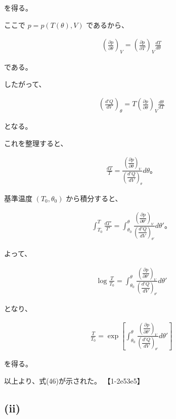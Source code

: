 \documentclass[platex,dvipdfmx,a4paper]{jsarticle}
\begin{document}
を得る。

ここで $p=p(T(\theta),V)$ であるから、

\begin{align*}
\left(
\frac{\partial p}{\partial \theta}
\right)_V
=
\left(
\frac{\partial p}{\partial T}
\right)_V
\frac{dT}{d\theta}
\end{align*}

である。

したがって、

\begin{align*}
\left(
\frac{d'Q}{dV}
\right)_\theta
=
T
\left(
\frac{\partial p}{\partial \theta}
\right)_V
\frac{d\theta}{dT}
\end{align*}

となる。

これを整理すると、

\begin{align*}
\frac{dT}{T}
=
\frac{
\left(
\dfrac{\partial p}{\partial \theta}
\right)_V
}{
\left(
\dfrac{d'Q}{dV}
\right)_\theta
}
d\theta。
\end{align*}

基準温度 $(T_0,\theta_0)$ から積分すると、

\begin{align*}
\int_{T_0}^{T}\frac{dT'}{T'}
=
\int_{\theta_0}^{\theta}
\frac{
\left(
\dfrac{\partial p}{\partial \theta'}
\right)_V
}{
\left(
\dfrac{d'Q}{dV}
\right)_{\theta'}
}
d\theta'。
\end{align*}

よって、

\begin{align*}
\log\frac{T}{T_0}
=
\int_{\theta_0}^{\theta}
\frac{
\left(
\dfrac{\partial p}{\partial \theta'}
\right)_V
}{
\left(
\dfrac{d'Q}{dV}
\right)_{\theta'}
}
d\theta'
\end{align*}

となり、

\begin{align*}
\frac{T}{T_0}
=
\exp\left[
\int_{\theta_0}^{\theta}
\frac{
\left(
\dfrac{\partial p}{\partial \theta'}
\right)_V
}{
\left(
\dfrac{d'Q}{dV}
\right)_{\theta'}
}
d\theta'
\right]
\end{align*}

を得る。

以上より、式(46)が示された。 【1-2e53e5】

\subsection{(ii)}
\end{document}
